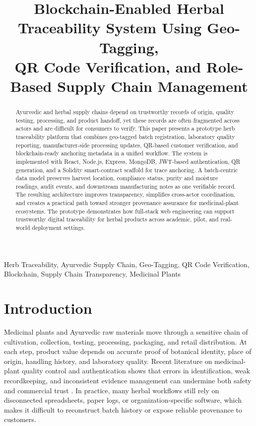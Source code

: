 \documentclass[conference]{IEEEtran}
\title{Blockchain-Enabled Herbal Traceability System Using Geo-Tagging,\\ QR Code Verification, and Role-Based Supply Chain Management}
\author{
\IEEEauthorblockN{Nikhil Sahu}
\IEEEauthorblockA{
School of Information Science\\
Presidency University\\
\texttt{nikhilsahu8004@gmail.com}
}
\and
\IEEEauthorblockN{Devi. S}
\IEEEauthorblockA{
Presidency School of Information Science\\
Presidency University\\
\texttt{devi.s@presidencyuniversity.in}
}
}
\begin{document}
\maketitle

\begin{abstract}
Ayurvedic and herbal supply chains depend on trustworthy records of origin, quality testing, processing, and product handoff, yet these records are often fragmented across actors and are difficult for consumers to verify. This paper presents a prototype herb traceability platform that combines geo-tagged batch registration, laboratory quality reporting, manufacturer-side processing updates, QR-based customer verification, and blockchain-ready anchoring metadata in a unified workflow. The system is implemented with React, Node.js, Express, MongoDB, JWT-based authentication, QR generation, and a Solidity smart-contract scaffold for trace anchoring. A batch-centric data model preserves harvest location, compliance status, purity and moisture readings, audit events, and downstream manufacturing notes as one verifiable record. The resulting architecture improves transparency, simplifies cross-actor coordination, and creates a practical path toward stronger provenance assurance for medicinal-plant ecosystems. The prototype demonstrates how full-stack web engineering can support trustworthy digital traceability for herbal products across academic, pilot, and real-world deployment settings.
\end{abstract}

\begin{IEEEkeywords}
Herb Traceability, Ayurvedic Supply Chain, Geo-Tagging, QR Code Verification, Blockchain, Supply Chain Transparency, Medicinal Plants
\end{IEEEkeywords}

\section{Introduction}
Medicinal plants and Ayurvedic raw materials move through a sensitive chain of cultivation, collection, testing, processing, packaging, and retail distribution. At each step, product value depends on accurate proof of botanical identity, place of origin, handling history, and laboratory quality. Recent literature on medicinal-plant quality control and authentication shows that errors in identification, weak recordkeeping, and inconsistent evidence management can undermine both safety and commercial trust \cite{b10,b11,b12,b13,b14,b15}. In practice, many herbal workflows still rely on disconnected spreadsheets, paper logs, or organization-specific software, which makes it difficult to reconstruct batch history or expose reliable provenance to customers.
\end{document}
